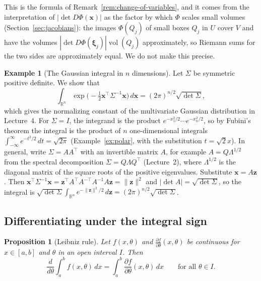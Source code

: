 \documentclass[11pt]{article}
\newcommand{\norm}[1]{\lVert #1 \rVert}
\theoremstyle{definition}
\newtheorem{example}[definition]{Example}
\theoremstyle{plain}
\newtheorem{proposition}[definition]{Proposition}
\theoremstyle{remark}
\DeclareMathOperator{\vol}{vol}
\begin{document}
This is the formula of Remark~\ref{rem:change-of-variables}, and it comes from the interpretation of $|\det D\Phi(\mathbf{x})|$ as the factor by which $\Phi$ scales small volumes (Section~\ref{sec:jacobians}): the images $\Phi(Q_j)$ of small boxes $Q_j$ in $U$ cover $V$ and have the volumes $|\det D\Phi(\boldsymbol{\xi}_j)|\vol(Q_j)$ approximately, so Riemann sums for the two sides are approximately equal. We do not make this precise.

\begin{example}[The Gaussian integral in $n$ dimensions]\label{ex:gauss-integral}
    Let $\Sigma$ be symmetric positive definite. We show that
    \[\int_{\mathbb{R}^n} \exp\big(-\tfrac{1}{2}\mathbf{x}^\top\Sigma^{-1}\mathbf{x}\big)\, d\mathbf{x} = (2\pi)^{n/2}\sqrt{\det\Sigma},\]
    which gives the normalizing constant of the multivariate Gaussian distribution in Lecture~4. For $\Sigma = I$, the integrand is the product $e^{-x_1^2/2}\cdots e^{-x_n^2/2}$, so by Fubini's theorem the integral is the product of $n$ one-dimensional integrals $\int_{-\infty}^\infty e^{-t^2/2}\, dt = \sqrt{2\pi}$ (Example~\ref{ex:polar}, with the substitution $t = \sqrt{2}x$). In general, write $\Sigma = AA^\top$ with an invertible matrix $A$, for example $A = Q\Lambda^{1/2}$ from the spectral decomposition $\Sigma = Q\Lambda Q^\top$ (Lecture~2), where $\Lambda^{1/2}$ is the diagonal matrix of the square roots of the positive eigenvalues. Substitute $\mathbf{x} = A\mathbf{z}$. Then $\mathbf{x}^\top\Sigma^{-1}\mathbf{x} = \mathbf{z}^\top A^\top A^{-\top}A^{-1}A\mathbf{z} = \norm{\mathbf{z}}^2$ and $|\det A| = \sqrt{\det\Sigma}$, so the integral is $\sqrt{\det\Sigma}\int_{\mathbb{R}^n} e^{-\norm{\mathbf{z}}^2/2}\, d\mathbf{z} = (2\pi)^{n/2}\sqrt{\det\Sigma}$.
\end{example}

\subsection{Differentiating under the integral sign}

\begin{proposition}[Leibniz rule]\label{prop:leibniz}
    Let $f(x, \theta)$ and $\frac{\partial f}{\partial\theta}(x, \theta)$ be continuous for $x \in [a, b]$ and $\theta$ in an open interval $I$. Then
    \[\frac{d}{d\theta}\int_a^b f(x, \theta)\, dx = \int_a^b \frac{\partial f}{\partial\theta}(x, \theta)\, dx \qquad \text{for all } \theta \in I.\]
\end{proposition}
\end{document}
